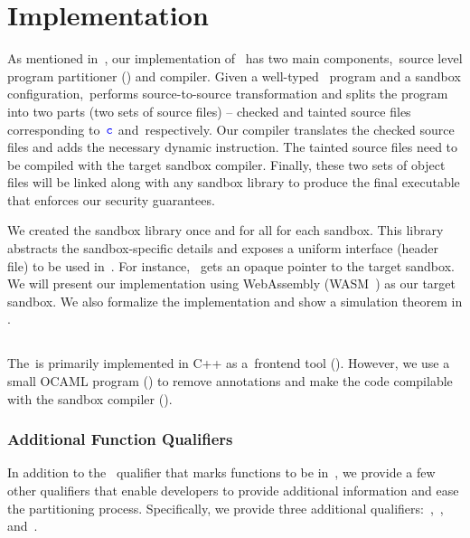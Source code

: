 \section{Implementation} \label{sec:implementation}
As mentioned in~, our implementation of~\systemname{} has two main components,~\ie source level program partitioner (\sourcerewriter) and compiler.
Given a well-typed~\systemname{} program and a sandbox configuration,~\sourcerewriter performs source-to-source transformation and splits the program into two parts (\ie two sets of source files) -- checked and tainted source files corresponding to~$\textcolor{blue}{\texttt{c}}$ and~\ucregion respectively.
Our compiler translates the checked source files and adds the necessary dynamic instruction.
The tainted source files need to be compiled with the target sandbox compiler.
Finally, these two sets of object files will be linked along with any sandbox library to produce the final executable that enforces our security guarantees.

We created the sandbox library once and for all for each sandbox.
This library abstracts the sandbox-specific details and exposes a uniform interface (header file) to be used in~\cregion.
For instance,~ gets an opaque pointer to the target sandbox.
We will present our implementation using WebAssembly (WASM~\cite{bosamiya2020webassembly}) as our target sandbox.
We also formalize the implementation and show a simulation theorem in .

\subsection{\sourcerewriter} \label{subsec:checkmate}
The~\sourcerewriter is primarily implemented in C++ as a~\clang frontend tool (\numcheckmatelines{}).
However, we use a small OCAML program (\numocamllines{}) to remove annotations and make the code compilable with the sandbox compiler ().

\subsubsection{Additional Function Qualifiers}
\label{subsubsec:addfuncqual}
In addition to the~ qualifier that marks functions to be in~\ucregion, we provide a few other qualifiers that enable developers to provide additional information and ease the partitioning process.
Specifically, we provide three additional qualifiers:~,~, and~.


